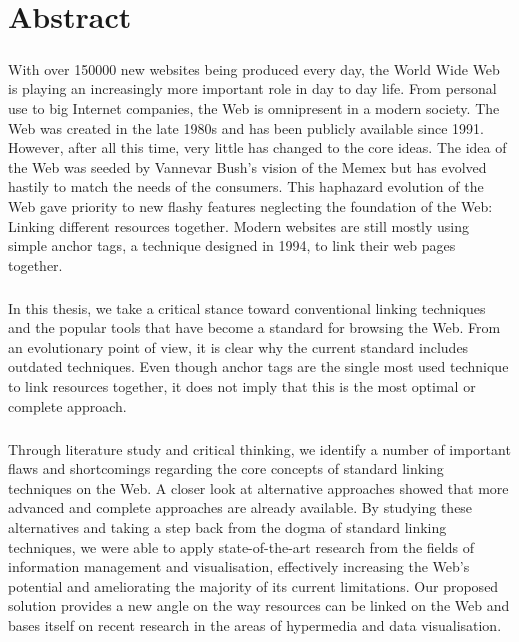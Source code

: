 
\chapter*{Abstract}
\thispagestyle{empty}
\paragraph{}
With over \num{150000} new websites being produced every day, the World Wide Web is playing an increasingly more important role in day to day life. From personal use to big Internet companies, the Web is omnipresent in a modern society. The Web was created in the late 1980s and has been publicly available since 1991. However, after all this time, very little has changed to the core ideas. The idea of the Web was seeded by Vannevar Bush's vision of the Memex but has evolved hastily to match the needs of the consumers. This haphazard evolution of the Web gave priority to new flashy features neglecting the foundation of the Web: Linking different resources together. Modern websites are still mostly using simple anchor tags, a technique designed in 1994, to link their web pages together.
\paragraph{}
In this thesis, we take a critical stance toward conventional linking techniques and the popular tools that have become a standard for browsing the Web. From an evolutionary point of view, it is clear why the current standard includes outdated techniques. Even though anchor tags are the single most used technique to link resources together, it does not imply that this is the most optimal or complete approach.
\paragraph{}
Through literature study and critical thinking, we identify a number of important flaws and shortcomings regarding the core concepts of standard linking techniques on the Web. A closer look at alternative approaches showed that more advanced and complete approaches are already available. By studying these alternatives and taking a step back from the dogma of standard linking techniques, we were able to apply state-of-the-art research from the fields of information management and visualisation, effectively increasing the Web's potential and ameliorating the majority of its current limitations. Our proposed solution provides a new angle on the way resources can be linked on the Web and bases itself on recent research in the areas of hypermedia and data visualisation.
